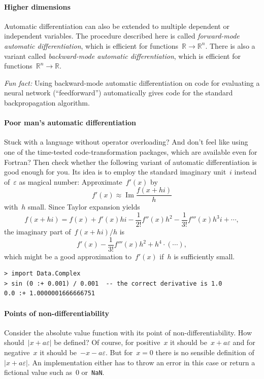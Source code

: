 \documentclass[a4paper,ngerman,12pt]{scrartcl}
\theoremstyle{definition}
\theoremstyle{plain}
\theoremstyle{remark}
\newcommand{\RR}{\mathbb{R}}
\begin{document}
\paragraph{Higher dimensions} Automatic differentiation can also be extended to
multiple dependent or independent variables. The procedure described here is
called \emph{forward-mode automatic differentiation}, which is efficient for
functions~$\RR \to \RR^n$. There is also a variant called \emph{backward-mode
automatic differentiation}, which is efficient for functions~$\RR^n \to \RR$.

\emph{Fun fact:} Using backward-mode automatic differentiation on code for
evaluating a neural network (``feedforward'') automatically gives code for the standard
backpropagation algorithm.

\paragraph{Poor man's automatic differentiation} Stuck with a language without
operator overloading? And don't feel like using one of the time-tested
code-transformation packages, which are available even for Fortran? Then check whether the
following variant of automatic differentiation is good enough for you. Its idea
is to employ the standard imaginary unit~$i$ instead of~$\varepsilon$ as
magical number: Approximate~$f'(x)$ by
\[ f'(x) \approx \operatorname{Im} \frac{f(x+hi)}{h} \]
with~$h$ small. Since Taylor expansion yields
\[ f(x+hi) = f(x) + f'(x)hi - \frac{1}{2!}f''(x)h^2 - \frac{1}{3!}f'''(x)h^3i +
\cdots, \]
the imaginary part of~$f(x+hi)/h$ is
\[ f'(x) - \frac{1}{3!} f'''(x) h^2 + h^4 \cdot (\cdots), \]
which might be a good approximation to~$f'(x)$ if~$h$ is sufficiently small.

\begin{verbatim}> import Data.Complex
> sin (0 :+ 0.001) / 0.001  -- the correct derivative is 1.0
0.0 :+ 1.0000001666666751
\end{verbatim}

\paragraph{Points of non-differentiability} Consider the absolute value
function with its point of non-differentiability. How should~$|x +
a\varepsilon|$ be defined? Of course, for positive~$x$ it should be~$x +
a\varepsilon$ and for negative~$x$ it should be~$-x - a\varepsilon$. But for~$x
= 0$ there is no sensible definition of~$|x + a\varepsilon|$. An implementation
either has to throw an error in this case or return a fictional value such
as~$0$ or~\texttt{NaN}.
\end{document}
